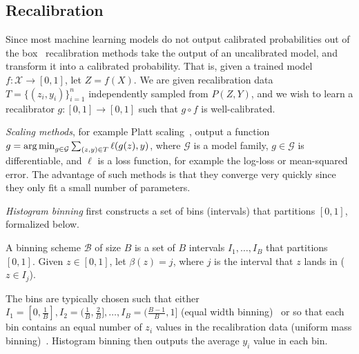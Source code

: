 \subsection{Recalibration}

Since most machine learning models do not output calibrated probabilities out of the box~\cite{guo2017calibration, zadrozny2001calibrated} recalibration methods take the output of an uncalibrated model, and transform it into a calibrated probability. That is, given a trained model $f: \mathcal{X} \to [0, 1]$, let $Z = f(X)$. We are given recalibration data $T = \{ (z_i, y_i) \}_{i=1}^n$ independently sampled from  $P(Z, Y)$, and we wish to learn a recalibrator $g : [0, 1] \to [0, 1]$ such that $g \circ f$ is well-calibrated.

\emph{Scaling methods}, for example Platt scaling~\cite{platt1999probabilistic}, output a function $g = \operatorname*{arg\,min}_{g \in \mathcal{G}} \sum_{(z, y) \in T} \ell(g(z), y)$, where $\mathcal{G}$ is a model family, $g \in \mathcal{G}$ is differentiable, and $\ell$ is a loss function, for example the log-loss or mean-squared error. The advantage of such methods is that they converge very quickly since they only fit a small number of parameters.

\emph{Histogram binning} first constructs a set of bins (intervals) that partitions $[0, 1]$, formalized below.

\begin{definition}
A binning scheme $\mathcal{B}$ of size $B$ is a set of $B$ intervals $I_1, \dots, I_B$ that partitions $[0, 1]$. Given $z \in [0, 1]$, let $\beta(z) = j$, where $j$ is the interval that $z$ lands in ($z \in I_j$).
\end{definition}

The bins are typically chosen such that either $I_1 = [0, \frac{1}{B}], I_2 = (\frac{1}{B}, \frac{2}{B}], \dots, I_B = (\frac{B-1}{B}, 1]$ (equal width binning)~\cite{guo2017calibration} or so that each bin contains an equal number of $z_i$ values in the recalibration data (uniform mass binning)~\cite{zadrozny2001calibrated}. Histogram binning then outputs the average $y_i$ value in each bin.
